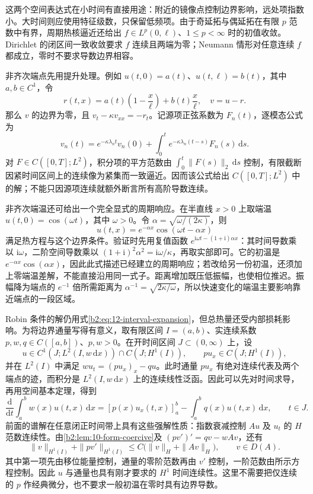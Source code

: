 这两个空间表达式在小时间有直接用途：附近的镜像点控制边界影响，远处项指数小。大时间则应使用特征级数，只保留低频项。由于奇延拓与偶延拓在有限 \(p\) 范数中有界，周期热核逼近还给出 \(f\in L^p(0,\ell)\)、\(1\leq p<\infty\) 时的初值收敛。Dirichlet 的闭区间一致收敛要求 \(f\) 连续且两端为零；Neumann 情形对任意连续 \(f\) 都成立，零时不要求导数边界相容。

\ProseParagraphBreak

非齐次端点先用提升处理。例如 \(u(t,0)=a(t)\)、\(u(t,\ell)=b(t)\)，其中 \(a,b\in C^1\)，令
\[
 r(t,x)=a(t)\left(1-\dfrac x\ell\right)+b(t)\dfrac x\ell,
 \quad v=u-r.
\]
那么 \(v\) 的边界为零，且 \(v_t-\kappa v_{xx}=-r_t\)。记源项正弦系数为 \(F_n(t)\)，逐模态公式为
\[
 v_n(t)=e^{-\kappa\lambda_nt}v_n(0)
 +\int_0^te^{-\kappa\lambda_n(t-s)}F_n(s)\,\mathrm{d}s.
\]
对 \(F\in C([0,T];L^2)\)，积分项的平方范数由 \(\int_0^t\|F(s)\|_2\,\mathrm{d}s\) 控制，有限截断因紧时间区间上的连续像为紧集而一致逼近。因而该公式给出 \(C([0,T];L^2)\) 中的解；不能只因源项连续就额外断言所有高阶导数连续。

\ProseParagraphBreak

非齐次端温还可给出一个完全显式的周期响应。在半直线 \(x>0\) 上取端温 \(u(t,0)=\cos(\omega t)\)，其中 \(\omega>0\)。令 \(\alpha=\sqrt{\omega/(2\kappa)}\)，则
\[
 u(t,x)=e^{-\alpha x}\cos(\omega t-\alpha x)
\]
满足热方程与这个边界条件。验证时先用复值函数 \(e^{\mathrm{i}\omega t-(1+\mathrm{i})\alpha x}\)：其时间导数乘以 \(\mathrm{i}\omega\)，二阶空间导数乘以 \((1+\mathrm{i})^2\alpha^2=\mathrm{i}\omega/\kappa\)，再取实部即可。它的初温是 \(e^{-\alpha x}\cos(\alpha x)\)，因此此式描述已经建立的周期响应；若改给另一份初温，还须加上零端温差解，不能直接沿用同一式子。距离增加既压低振幅，也使相位推迟。振幅降为端点的 \(e^{-1}\) 倍所需距离为 \(\alpha^{-1}=\sqrt{2\kappa/\omega}\)，所以快速变化的端温主要影响靠近端点的一段区域。

\ProseParagraphBreak

Robin 条件的解仍用式\eqref{b2:eq:12-interval-expansion}，但总热量还受内部损耗影响。为将边界通量写得有意义，取有限区间 \(I=(a,b)\)、实连续系数 \(p,w,q\in C([a,b])\)、\(p,w>0\)。在开时间区间 \(J\subset(0,\infty)\) 上，设
\[
 u\in C^1(J;L^2(I,w\,\mathrm{d}x))\cap C(J;H^1(I)),
 \qquad pu_x\in C(J;H^1(I)),
\]
并在 \(L^2(I)\) 中满足 \(wu_t=(pu_x)_x-qu\)。此时通量 \(pu_x\) 有绝对连续代表及两个端点的迹，而积分是 \(L^2(I,w\,\mathrm{d}x)\) 上的连续线性泛函。因此可以先对时间求导，再用空间基本定理，得到
\begin{equation}\label{b2:eq:12-weighted-heat-balance}
 \frac{\mathrm{d}}{\mathrm{d}t}\int_a^b w(x)u(t,x)\,\mathrm{d}x
 =[p(x)u_x(t,x)]_a^b-\int_a^b q(x)u(t,x)\,\mathrm{d}x,
 \qquad t\in J.
\end{equation}
前面的谱解在任意闭正时间带上具有这些强解性质：指数衰减控制 \(Au\) 及 \(u_t\) 的 \(H\) 范数连续性。由\cref{b2:lem:10-form-coercive}及 \((pv')'=qv-wAv\)，还有
\[
 \|v\|_{H^1(I)}+\|pv'\|_{H^1(I)}
 \leq C\bigl(\|v\|_H+\|Av\|_H\bigr),\qquad v\in D(A).
\]
其中第一项先由移位能量控制，通量的零阶范数再由 \(v'\) 控制，一阶范数由所示方程控制。因此 \(u\) 与通量也具有刚才要求的 \(H^1\) 时间连续性。这里不需要把仅连续的 \(p\) 作经典微分，也不要求一般初温在零时具有边界导数。

